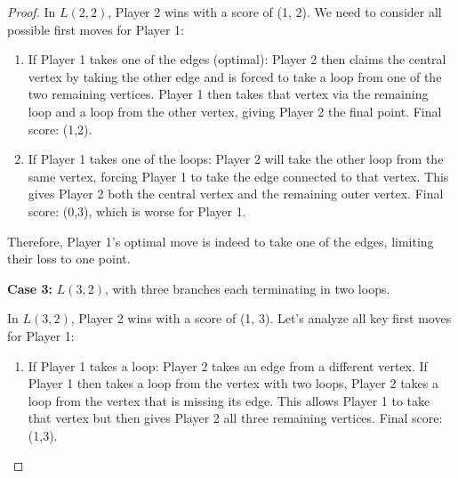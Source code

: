 \documentclass{article}
\begin{document}
\begin{proof}
In $L(2, 2)$, Player 2 wins with a score of (1, 2). We need to consider all possible first moves for Player 1:

\begin{enumerate}
    \item If Player 1 takes one of the edges (optimal): Player 2 then claims the central vertex by taking the other edge and is forced to take a loop from one of the two remaining vertices. Player 1 then takes that vertex via the remaining loop and a loop from the other vertex, giving Player 2 the final point. Final score: (1,2).
    
    \item If Player 1 takes one of the loops: Player 2 will take the other loop from the same vertex, forcing Player 1 to take the edge connected to that vertex. This gives Player 2 both the central vertex and the remaining outer vertex. Final score: (0,3), which is worse for Player 1.
\end{enumerate}

Therefore, Player 1's optimal move is indeed to take one of the edges, limiting their loss to one point.

\textbf{Case 3:} $L(3, 2)$, with three branches each terminating in two loops.

\begin{center}
\end{center}

In $L(3, 2)$, Player 2 wins with a score of (1, 3). Let's analyze all key first moves for Player 1:

\begin{enumerate}
    \item If Player 1 takes a loop: Player 2 takes an edge from a different vertex. If Player 1 then takes a loop from the vertex with two loops, Player 2 takes a loop from the vertex that is missing its edge. This allows Player 1 to take that vertex but then gives Player 2 all three remaining vertices. Final score: (1,3).
    

\end{enumerate}
\end{proof}
\end{document}
